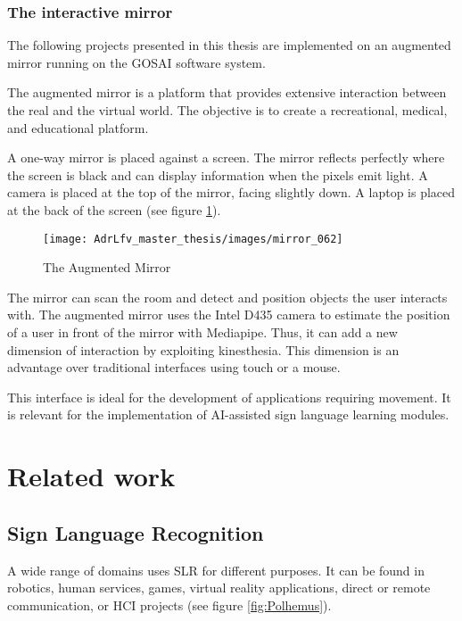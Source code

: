 \subsubsection{The interactive mirror}

The following projects presented in this thesis are implemented on an augmented mirror running on the GOSAI software system.

The augmented mirror is a platform that provides extensive interaction between the real and the virtual world. The objective is to create a recreational, medical, and educational platform.

A one-way mirror is placed against a screen. The mirror reflects perfectly where the screen is black and can display information when the pixels emit light. A camera is placed at the top of the mirror, facing slightly down. A laptop is placed at the back of the screen (see figure \ref{fig:mirror_062}).

\begin{figure}[h]
    \centering
    \texttt{[image: AdrLfv\_master\_thesis/images/mirror\_062]}
    \caption{The Augmented Mirror}
    \label{fig:mirror_062}
\end{figure}


The mirror can scan the room and detect and position objects the user interacts with. The augmented mirror uses the Intel D435 camera to estimate the position of a user in front of the mirror with Mediapipe. Thus, it can add a new dimension of interaction by exploiting kinesthesia. This dimension is an advantage over traditional interfaces using touch or a mouse. 

This interface is ideal for the development of applications requiring movement. It is relevant for the implementation of AI-assisted sign language learning modules.

\section{Related work}

\subsection{Sign Language Recognition}

A wide range of domains uses SLR for different purposes. It can be found in robotics, human services, games, virtual reality applications, direct or remote communication, or HCI projects \cite{adeyanju2021machine} (see figure \ref{fig:Polhemus}).

